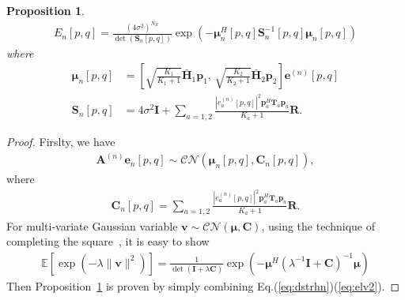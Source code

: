 \documentclass[journal,draftcls,onecolumn,12pt,twoside]{IEEEtran}
\newtheorem{proposition}{Proposition}
\begin{document}
\begin{proposition}
  \begin{align}
      E_n[p,q] =
      \frac{(4\sigma^2)^{N_R}}{\det(\mathbf{S}_n[p,q])}
      \exp\left(-\bm{\mu}_n^H[p,q]\mathbf{S}_n^{-1}[p,q]\bm{\mu}_n[p,q]\right)
  \end{align}
  where 
  \begin{subequations}
    \begin{align}
      \bm{\mu}_n[p,q] & =
      \left[\sqrt{\frac{K_1}{K_1+1}}\bar{\mathbf{H}}_1\mathbf{p}_1
      ,\, \sqrt{\frac{K_2}{K_2+1}}\bar{\mathbf{H}}_2\mathbf{p}_2
      \right]\mathbf{e}^{(n)}[p,q]
      \\
      \mathbf{S}_n[p,q] & =
      4\sigma^2\mathbf{I} +
      \sum_{a=1,2} \frac{|e_a^{(n)}[p,q]|^2 \mathbf{p}_a^H\mathbf{T}_a
      \mathbf{p}_a}{K_a+1} \mathbf{R}.
    \end{align}
  \end{subequations}
  \label{prop:en}
\end{proposition}
\begin{proof}
  Firslty, we have
  \begin{align}
      \mathbf{A}^{(n)}\mathbf{e}_n[p,q]
      \sim\mathcal{CN}(\bm{\mu}_n[p,q],
      \mathbf{C}_n[p,q]), \label{eq:dstrhn}
  \end{align}
  where 
  \begin{align}
    \mathbf{C}_n[p,q] = \sum_{a=1,2}
    \frac{|e_a^{(n)}[p,q]|^2\mathbf{p}_a^H\mathbf{T}_a
    \mathbf{p}_a}{K_a+1}\mathbf{R}.
  \end{align}
  For multi-variate Gaussian variable $\mathbf{v}\sim\mathcal{CN}(\bm{\mu},
    \mathbf{C})$, using the technique of completing the square~\cite[Sec.
    2.3.1]{bishop2006pattern}, it is easy to show
    \begin{align}
        \mathbb{E}\left[\exp(-\lambda\|\mathbf{v}\|^2)\right] =
        \frac{1}{\det(\mathbf{I} +
        \lambda\mathbf{C})}\exp\left(-\bm{\mu}^H(\lambda^{-1}\mathbf{I} +
        \mathbf{C})^{-1}\bm{\mu}\right) \label{eq:elv2}
    \end{align}
    Then Proposition~\ref{prop:en} is proven by simply combining
    Eq.(\ref{eq:dstrhn})(\ref{eq:elv2}).
\end{proof}
\end{document}
